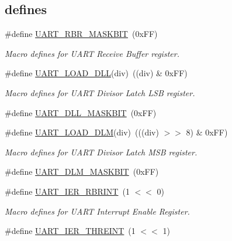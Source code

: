 \subsection*{\textquotesingle{}defines\textquotesingle{}}
\begin{DoxyCompactItemize}
\item 
\#define \hyperlink{group___u_a_r_t__18_x_x__43_x_x_ga06774e65c2ca095c4373122ed9a390b8}{U\+A\+R\+T\+\_\+\+R\+B\+R\+\_\+\+M\+A\+S\+K\+B\+IT}~(0x\+F\+F)
\begin{DoxyCompactList}\small\item\em Macro defines for U\+A\+RT Receive Buffer register. \end{DoxyCompactList}\item 
\#define \hyperlink{group___u_a_r_t__18_x_x__43_x_x_ga55a89461d99a43769772276e51a6710a}{U\+A\+R\+T\+\_\+\+L\+O\+A\+D\+\_\+\+D\+LL}(div)~((div) \& 0x\+F\+F)
\begin{DoxyCompactList}\small\item\em Macro defines for U\+A\+RT Divisor Latch L\+SB register. \end{DoxyCompactList}\item 
\#define \hyperlink{group___u_a_r_t__18_x_x__43_x_x_ga85050a24048ffc2de997cd60ea67f9df}{U\+A\+R\+T\+\_\+\+D\+L\+L\+\_\+\+M\+A\+S\+K\+B\+IT}~(0x\+F\+F)
\item 
\#define \hyperlink{group___u_a_r_t__18_x_x__43_x_x_gac53f4cc36f13edd3fdf7fd9bab1360e2}{U\+A\+R\+T\+\_\+\+L\+O\+A\+D\+\_\+\+D\+LM}(div)~(((div) $>$$>$ 8) \& 0x\+F\+F)
\begin{DoxyCompactList}\small\item\em Macro defines for U\+A\+RT Divisor Latch M\+SB register. \end{DoxyCompactList}\item 
\#define \hyperlink{group___u_a_r_t__18_x_x__43_x_x_gaf4d480e07f82896893e45b572adeffcd}{U\+A\+R\+T\+\_\+\+D\+L\+M\+\_\+\+M\+A\+S\+K\+B\+IT}~(0x\+F\+F)
\item 
\#define \hyperlink{group___u_a_r_t__18_x_x__43_x_x_gafe8ecd345fb121d6b0ce19f4ce6672ba}{U\+A\+R\+T\+\_\+\+I\+E\+R\+\_\+\+R\+B\+R\+I\+NT}~(1 $<$$<$ 0)
\begin{DoxyCompactList}\small\item\em Macro defines for U\+A\+RT Interrupt Enable Register. \end{DoxyCompactList}\item 
\#define \hyperlink{group___u_a_r_t__18_x_x__43_x_x_gaa0d5f875782af503852f8b8f93292673}{U\+A\+R\+T\+\_\+\+I\+E\+R\+\_\+\+T\+H\+R\+E\+I\+NT}~(1 $<$$<$ 1)
$$
\end{DoxyCompactItemize}
